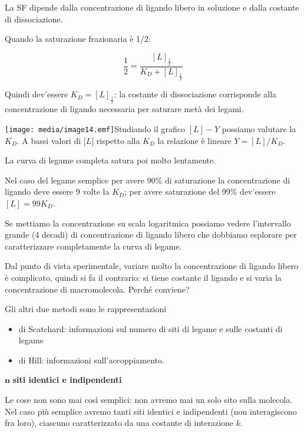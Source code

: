 La SF dipende dalla concentrazione di ligando libero in soluzione e
dalla costante di dissociazione.

Quando la saturazione frazionaria è 1/2:

\[\frac{1}{2} = \frac{\left\lbrack L \right\rbrack_{\frac{1}{2}}}{K_{D} + \left\lbrack L \right\rbrack_{\frac{1}{2}}}\]

Quindi dev'essere
\(K_{D} = \left\lbrack L \right\rbrack_{\frac{1}{2}}\): la costante di
dissociazione corrisponde alla concentrazione di ligando necessaria per
saturare metà dei legami.

\texttt{[image: media/image14.emf]}Studiando
il grafico \(\left\lbrack L \right\rbrack - Y\) possiamo valutare la
\(K_{D}\). A bassi valori di \(\lbrack L\rbrack\) rispetto alla
\(K_{D}\) la relazione è lineare
\(Y = \left\lbrack L \right\rbrack/K_{D}\).

La curva di legame completa satura poi molto lentamente.

Nel caso del legame semplice per avere 90\% di saturazione la
concentrazione di ligando deve essere 9 volte la \(K_{D}\); per avere
saturazione del 99\% dev'essere
\(\left\lbrack L \right\rbrack = 99K_{D}\).

Se mettiamo la concentrazione su scala logaritmica possiamo vedere
l'intervallo grande (4 decadi) di concentrazione di ligando libero che
dobbiamo esplorare per caratterizzare completamente la curva di legame.

Dal punto di vista sperimentale, variare molto la concentrazione di
ligando libero è complicato, quindi si fa il contrario: si tiene
costante il ligando e si varia la concentrazione di macromolecola.
Perché conviene?

Gli altri due metodi sono le rappresentazioni

\begin{itemize}
\item
  di Scatchard: informazioni sul numero di siti di legame e sulle
  costanti di legame
\item
  di Hill: informazioni sull'accoppiamento.
\end{itemize}

\(\mathbf{n}\) \textbf{siti identici e indipendenti}

Le cose non sono mai così semplici: non avremo mai un solo sito sulla
molecola. Nel caso più semplice avremo tanti siti identici e
indipendenti (non interagiscono fra loro), ciascuno caratterizzato da
una costante di interazione \(k\).

